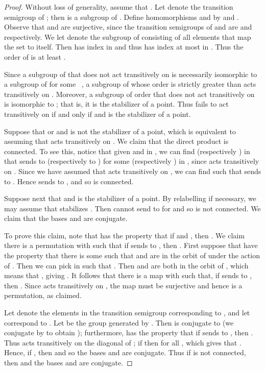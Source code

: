 \documentclass{llncs}
\begin{document}
\begin{proof}
Without loss of generality, assume that .
Let  denote the transition semigroup of ; then  is a subgroup of . Define homomorphisms  and  by  and . Observe that  and  are surjective, since the transition semigroups of  and  are  and  respectively.  We let  denote the subgroup of  consisting of all elements that map the set  to itself.  Then  has index  in  and thus  has index at most  in .
Thus the order of  is at least .  

Since a subgroup of  that does not act transitively on  is necessarily isomorphic to a subgroup of  for some ~\cite[Section 2.5.1]{Wil09},  a subgroup of  whose order is strictly greater than  acts transitively on .  Moreover, a subgroup of order  that does not act transitively on  is isomorphic to ; that is, it is the stabilizer of a point.  Thus  fails to act transitively on  if and only if  and  is the stabilizer of a point. 

Suppose that  or  and  is not the stabilizer of a point,  which is equivalent to assuming that  acts transitively on .  We claim that the direct product  is connected.  To see this, notice that given  and  in , we can find  (respectively ) in  that  sends  to  (respectively  to ) for some  (respectively ) in , since  acts transitively on .  
Since we have assumed that  acts transitively on , we can find  such that   sends  to . Hence 
 sends  to , and so  is connected. 




Suppose next that  and  is the stabilizer of a point.   By relabelling if necessary, we may assume that  stabilizes .   Then  cannot send  to  for  and so  is not connected.  We claim that the bases  and  are conjugate.  

To prove this claim, note that  has the property that if  and , then .  
We claim there is a permutation  with  such that if  sends  to , then . First suppose that  have the property that there is some  such that  and  are in the orbit of  under the action of .  Then we can pick  in  such that .  Then  and  are both in the orbit of , which means that , giving .  It follows that there is a map  with  such that,
if  sends  to , then .  Since  acts transitively on , the map  must be surjective and hence is a permutation, as claimed.

Let  denote the elements in the transition semigroup corresponding to , and let   correspond to .   
Let  be the group generated by .
Then  is conjugate to  (we conjugate  by  to obtain ); furthermore,   has the property that if  sends  to , then .  Thus  acts transitively on the diagonal of ; if  then  for all , which gives that . Hence, if , then   and so the bases  and  are conjugate.  
Thus if   
 is not connected, then  and the bases  and  are conjugate.



\end{proof}
\end{document}
